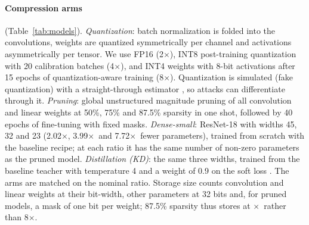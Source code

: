 \documentclass[10pt]{article}
\newcommand{\x}{$\times$}
\begin{document}
\paragraph{Compression arms} (Table~\ref{tab:models}).
\emph{Quantization}: batch normalization is folded into the convolutions, weights are quantized symmetrically per channel
and activations asymmetrically per tensor. We use FP16 (2\x), INT8 post-training quantization with 20 calibration batches
(4\x), and INT4 weights with 8-bit activations after 15 epochs of quantization-aware training (8\x). Quantization is
simulated (fake quantization) with a straight-through estimator \citep{bengio2013estimating}, so attacks can differentiate
through it.
\emph{Pruning}: global unstructured magnitude pruning of all convolution and linear weights at 50\%, 75\% and 87.5\%
sparsity in one shot, followed by 40 epochs of fine-tuning with fixed masks.
\emph{Dense-small}: ResNet-18 with widths 45, 32 and 23 (2.02\x, 3.99\x\ and 7.72\x\ fewer parameters), trained from scratch
with the baseline recipe; at each ratio it has the same number of non-zero parameters as the pruned model.
\emph{Distillation (KD)}: the same three widths, trained from the baseline teacher with temperature 4 and a weight of 0.9 on
the soft loss \citep{hinton2015distilling}.
The arms are matched on the nominal ratio. Storage size counts convolution and linear weights at their bit-width, other
parameters at 32 bits and, for pruned models, a mask of one bit per weight; 87.5\% sparsity thus stores at
\x\ rather than 8\x.

\begin{table}[t]
\centering
\caption{The 13 CIFAR-10 models: storage ratio relative to the baseline, non-zero parameters, and clean accuracy of the
vanilla and the defended (mask-augmented) zoo, mean {\scriptsize$\pm$ std} over  seeds (\%).}
\label{tab:models}
\small

\end{table}
\end{document}
